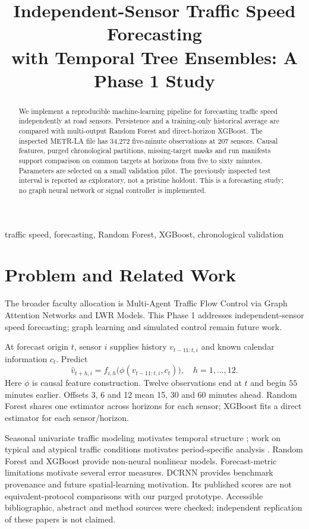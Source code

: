 \documentclass[conference]{IEEEtran}
\title{Independent-Sensor Traffic Speed Forecasting\\with Temporal Tree Ensembles: A Phase 1 Study}
\author{\IEEEauthorblockN{Team T072, Section C}
\IEEEauthorblockA{Rudraksh Sharma, Anshuman Mehta, Vridhi Chaudhary,\\Bineet Keshari, and Kavya Katal}}
\begin{document}
\maketitle
\begin{abstract}
We implement a reproducible machine-learning pipeline for forecasting traffic speed independently at road sensors. Persistence and a training-only historical average are compared with multi-output Random Forest and direct-horizon XGBoost. The inspected METR-LA file has 34,272 five-minute observations at 207 sensors. Causal features, purged chronological partitions, missing-target masks and run manifests support comparison on common targets at horizons from five to sixty minutes. Parameters are selected on a small validation pilot. The previously inspected test interval is reported as exploratory, not a pristine holdout. This is a forecasting study; no graph neural network or signal controller is implemented.
\end{abstract}
\begin{IEEEkeywords}
traffic speed, forecasting, Random Forest, XGBoost, chronological validation
\end{IEEEkeywords}

\section{Problem and Related Work}
The broader faculty allocation is Multi-Agent Traffic Flow Control via Graph Attention Networks and LWR Models. This Phase 1 addresses independent-sensor speed forecasting; graph learning and simulated control remain future work.

At forecast origin $t$, sensor $i$ supplies history $v_{t-11:t,i}$ and known calendar information $c_t$. Predict
\begin{equation}
\hat v_{t+h,i}=f_{i,h}\bigl(\phi(v_{t-11:t,i},c_t)\bigr),\quad h=1,\ldots,12.
\end{equation}
Here $\phi$ is causal feature construction. Twelve observations end at $t$ and begin $55$ minutes earlier. Offsets 3, 6 and 12 mean 15, 30 and 60 minutes ahead. Random Forest shares one estimator across horizons for each sensor; XGBoost fits a direct estimator for each sensor/horizon.

Seasonal univariate traffic modeling motivates temporal structure \cite{williams}; work on typical and atypical traffic conditions motivates period-specific analysis \cite{castro}. Random Forest \cite{breiman} and XGBoost \cite{chen} provide non-neural nonlinear models. Forecast-metric limitations \cite{hyndman} motivate several error measures. DCRNN \cite{li} provides benchmark provenance and future spatial-learning motivation. Its published scores are not equivalent-protocol comparisons with our purged prototype. Accessible bibliographic, abstract and method sources were checked; independent replication of these papers is not claimed.
\end{document}
